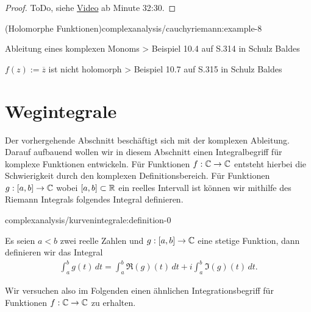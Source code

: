 \begin{proof}
 ToDo, siehe \href{https://www.fau.tv/clip/id/40944}{Video} ab Minute 32:30.
\end{proof}
\begin{example}{(Holomorphe Funktionen)}{complexanalysis/cauchyriemann:example-8}



\par
Ableitung eines komplexen Monoms  > Beispiel 10.4 auf S.314 in Schulz Baldes

\par
\(f(z) := \overline{z}\) ist nicht holomorph  > Beispiel 10.7 auf S.315 in Schulz Baldes
\end{example}


\section{Wegintegrale}
\label{\detokenize{complexanalysis/kurvenintegrale:wegintegrale}}\label{\detokenize{complexanalysis/kurvenintegrale::doc}}
\par
Der vorhergehende Abschnitt beschäftigt sich mit der komplexen Ableitung. Darauf aufbauend wollen wir in diesem Abschnitt einen Integralbegriff für komplexe Funktionen entwickeln. Für Funktionen \(f:\mathbb{C}\to\mathbb{C}\) entsteht hierbei die Schwierigkeit durch den komplexen Definitionsbereich. Für Funktionen \(g:[a,b]\to\mathbb{C}\) wobei \([a,b]\subset\mathbb{R}\) ein reelles Intervall ist können wir mithilfe des Riemann Integrals folgendes Integral definieren.
\begin{definition}{}{complexanalysis/kurvenintegrale:definition-0}



\par
Es seien \(a<b\) zwei reelle Zahlen und \(g:[a,b]\to\mathbb{C}\) eine stetige Funktion, dann definieren wir das Integral
\begin{align*}
\int_a^b g(t)\, dt = \int_a^b \Re(g)(t)\,dt + i\int_a^b \Im(g)(t)\, dt.
\end{align*}\end{definition}

\par
Wir versuchen also im Folgenden einen ähnlichen Integrationsbegriff für Funktionen \(f:\mathbb{C}\to\mathbb{C}\) zu erhalten.


